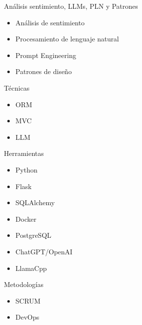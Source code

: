 \documentclass[aspectratio=169,xcolor=dvipsnames, t]{beamer}
\begin{document}

\begin{frame}{Análisis sentimiento, LLMs, PLN y Patrones}
    \begin{itemize}
        \item Análisis de sentimiento
        \item Procesamiento de lenguaje natural
        \item Prompt Engineering
        \item Patrones de diseño
    \end{itemize}
\end{frame}


\begin{frame}{Técnicas}
    \begin{itemize}
        \item ORM
        \item MVC
        \item LLM
    \end{itemize}
\end{frame}

\begin{frame}{Herramientas}
    \begin{itemize}
        \item Python
        \item Flask
        \item SQLAlchemy
        \item Docker
        \item PostgreSQL
        \item ChatGPT/OpenAI
        \item LlamaCpp
    \end{itemize}
\end{frame}



\begin{frame}{Metodologías}
    \begin{itemize}
        \item SCRUM
        \item DevOps
    \end{itemize}
\end{frame}
\end{document}
